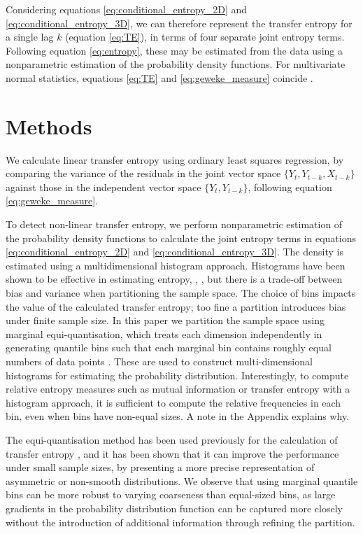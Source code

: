 \documentclass[]{rsos}%
\begin{document}
{  Considering equations \ref{eq:conditional_entropy_2D} and \ref{eq:conditional_entropy_3D}, we can therefore represent the transfer entropy for a single lag $k$ (equation \ref{eq:TE}), in terms of four separate joint entropy terms. Following equation \ref{eq:entropy}, these may be estimated from the data using a nonparametric  estimation of the probability density functions. For multivariate normal statistics, equations \ref{eq:TE} and \ref{eq:geweke_measure} coincide \cite{barnett2009granger}.


\section{Methods} \label{s.method}

  We calculate linear transfer entropy using ordinary least squares regression, by comparing the variance of the residuals in the joint vector space $ \{Y_t, Y_{t-k}, X_{t-k} \} $ against those in the independent vector space $ \{Y_t, Y_{t-k}\}$, following equation \ref{eq:geweke_measure}. 
  
  To detect non-linear transfer entropy, we perform nonparametric estimation of the probability density functions to calculate the joint entropy terms in equations \ref{eq:conditional_entropy_2D} and \ref{eq:conditional_entropy_3D}. The density is estimated using a multidimensional histogram approach. Histograms have been shown to be effective in estimating entropy, \cite{boba2015efficient}, \cite{Marschinski2002}, but there is a trade-off between bias and variance when partitioning the sample space. The choice of bins impacts the value of the calculated transfer entropy; too fine a partition introduces bias under finite sample size. In this paper we partition the sample space using marginal equi-quantisation, which treats each dimension independently in generating quantile bins such that each marginal bin contains roughly equal numbers of data points \cite{hlavavckova2007causality}. These are used to construct multi-dimensional histograms for estimating the probability distribution. 
Interestingly, to compute relative entropy measures such as mutual information or transfer entropy with a histogram approach, it is sufficient to compute the relative frequencies in each bin, even when bins have non-equal sizes. A note in the Appendix explains why.
  
  The equi-quantisation method has been used previously for the calculation of transfer entropy \cite{hlavavckova2007causality} \cite{darbellay1999estimation}, \cite{Marschinski2002} and it has been shown that it can improve the performance under small sample sizes, by presenting a more precise representation of asymmetric or non-smooth distributions. We observe that using marginal quantile bins can be more robust to varying coarseness than equal-sized bins, as large gradients in the probability distribution function can be captured more closely without the introduction of additional information through refining the partition. 
   

}
\end{document}

